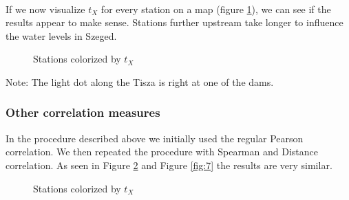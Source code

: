 \documentclass{article}
\begin{document}
\

If we now visualize $t_X$ for every station on a map (figure \ref{fig:5}), we can see if the
results appear to make sense. Stations further upstream take longer to
influence the water levels in Szeged.

\begin{figure}[h]
  \centering
  \caption{Stations colorized by $t_X$}
  \label{fig:5}
\end{figure}

Note: The light dot along the Tisza is right at one of the dams.

\subsubsection{Other correlation measures}

In the procedure described above we initially used the regular Pearson
correlation. We then repeated the procedure with Spearman and Distance
correlation. As seen in Figure \ref{fig:6} and Figure \ref{fig:7} the results are very similar.

\begin{figure}[h]
  \centering
  \caption{Stations colorized by $t_X$}
  \label{fig:6}
\end{figure}
\end{document}
